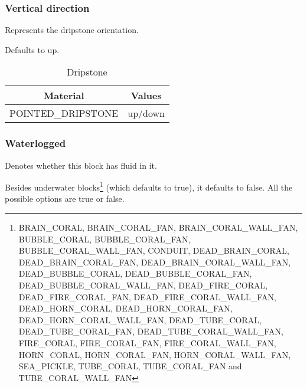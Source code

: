 \subsubsection{Vertical direction}
Represents the dripstone orientation.

Defaults to up.

\begin{table}[H]
	\centering
	\begin{tabular}{ |c|c| }
		\hline
		Material & Values \\
		\hline
		POINTED\_DRIPSTONE & up/down \\
		\hline
	\end{tabular}
	\caption{Dripstone}
\end{table}

\subsubsection{Waterlogged}
Denotes whether this block has fluid in it.

Besides underwater blocks\footnote{BRAIN\_CORAL, BRAIN\_CORAL\_FAN, BRAIN\_CORAL\_WALL\_FAN, BUBBLE\_CORAL, BUBBLE\_CORAL\_FAN, BUBBLE\_CORAL\_WALL\_FAN, CONDUIT, DEAD\_BRAIN\_CORAL, DEAD\_BRAIN\_CORAL\_FAN, DEAD\_BRAIN\_CORAL\_WALL\_FAN, DEAD\_BUBBLE\_CORAL, DEAD\_BUBBLE\_CORAL\_FAN, DEAD\_BUBBLE\_CORAL\_WALL\_FAN, DEAD\_FIRE\_CORAL, DEAD\_FIRE\_CORAL\_FAN, DEAD\_FIRE\_CORAL\_WALL\_FAN, DEAD\_HORN\_CORAL, DEAD\_HORN\_CORAL\_FAN, DEAD\_HORN\_CORAL\_WALL\_FAN, DEAD\_TUBE\_CORAL, DEAD\_TUBE\_CORAL\_FAN, DEAD\_TUBE\_CORAL\_WALL\_FAN, FIRE\_CORAL, FIRE\_CORAL\_FAN, FIRE\_CORAL\_WALL\_FAN, HORN\_CORAL, HORN\_CORAL\_FAN, HORN\_CORAL\_WALL\_FAN, SEA\_PICKLE, TUBE\_CORAL, TUBE\_CORAL\_FAN and TUBE\_CORAL\_WALL\_FAN} (which defaults to true), it defaults to false. All the possible options are true or false.

